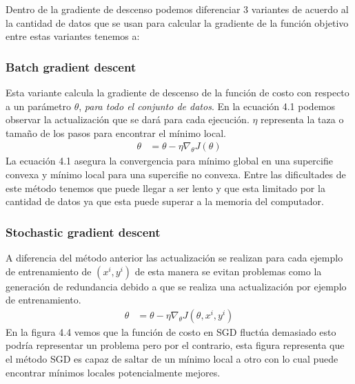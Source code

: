 Dentro de la gradiente de descenso podemos diferenciar 3 variantes de acuerdo al la cantidad de datos que se usan para calcular la gradiente de la función objetivo entre estas variantes tenemos a:\\

\subsubsection{Batch gradient descent}
Esta variante calcula la gradiente de descenso de la función de costo con respecto a un parámetro $\theta$, \textit{para todo el conjunto de datos}. En la ecuación 4.1 podemos observar la actualización que se dará para cada ejecución. $\eta$ representa la taza o tamaño de los pasos para encontrar el mínimo local.
\begin{equation}
\label{bgds}
\begin{aligned}
\theta &= \theta - \eta \nabla_{\theta} J(\theta)
\end{aligned}
\end{equation}
La ecuación 4.1 asegura la convergencia para mínimo global en una supercifie convexa y mínimo local para una supercifie no convexa. Entre las dificultades de este método tenemos que puede llegar a ser lento y que esta limitado por la cantidad de datos ya que esta puede superar a la memoria del computador.	
\subsubsection{Stochastic gradient descent}
A diferencia del método anterior las actualización se realizan para cada ejemplo de entrenamiento de $(x^{i},y^{i})$ de esta manera se evitan problemas como la generación de redundancia debido a que se realiza una actualización por ejemplo de entrenamiento.
\begin{equation}
\label{sgds}
\begin{aligned}
\theta &= \theta - \eta \nabla_{\theta} J(\theta,x^{i},y^{i})
\end{aligned}
\end{equation}
En la figura 4.4 vemos que la función de costo en SGD fluctúa demasiado esto podría representar un problema pero por el contrario, esta figura representa que el método SGD es capaz de saltar de un mínimo local a otro con lo cual puede encontrar mínimos locales potencialmente mejores.

